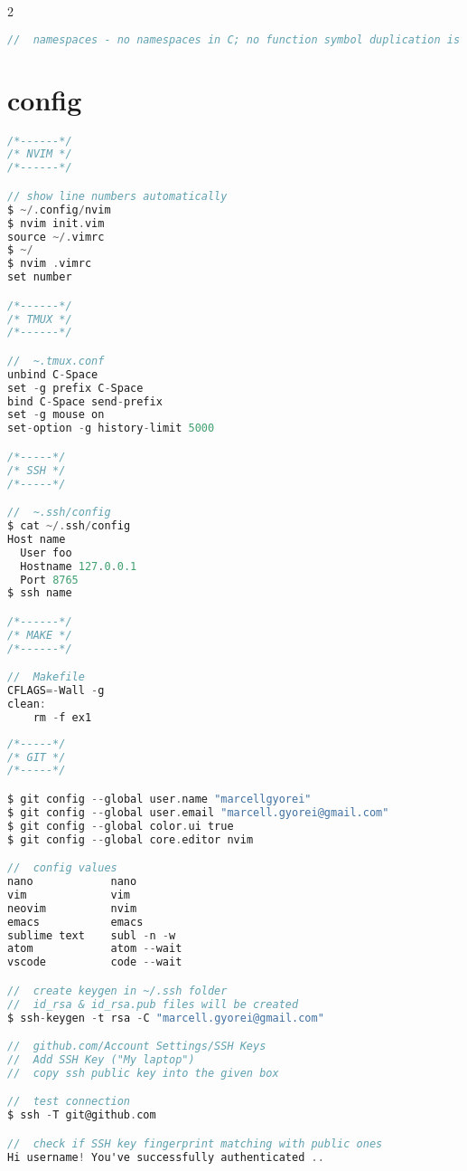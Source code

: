 \documentclass[8pt]{extarticle}
\begin{document}
\begin{small}
\begin{multicols}{2}
\begin{lstlisting}[language=C]
//  namespaces - no namespaces in C; no function symbol duplication is allowed; prefixes are used; HAL_StatusTypeDef; it means StatusTypeDef belongs to HAL library

\end{lstlisting}

\vfill\null

\section{config}

\begin{lstlisting}[language=C]
/*------*/
/* NVIM */
/*------*/

// show line numbers automatically
$ ~/.config/nvim
$ nvim init.vim
source ~/.vimrc
$ ~/
$ nvim .vimrc
set number

/*------*/
/* TMUX */
/*------*/

//  ~.tmux.conf
unbind C-Space
set -g prefix C-Space
bind C-Space send-prefix
set -g mouse on
set-option -g history-limit 5000

/*-----*/
/* SSH */
/*-----*/

//  ~.ssh/config
$ cat ~/.ssh/config
Host name
  User foo
  Hostname 127.0.0.1
  Port 8765
$ ssh name

/*------*/
/* MAKE */
/*------*/

//  Makefile
CFLAGS=-Wall -g
clean:
	rm -f ex1

\end{lstlisting}

\begin{lstlisting}[language=C]
/*-----*/
/* GIT */
/*-----*/

$ git config --global user.name "marcellgyorei"
$ git config --global user.email "marcell.gyorei@gmail.com"
$ git config --global color.ui true
$ git config --global core.editor nvim

//  config values
nano			nano
vim				vim
neovim			nvim
emacs			emacs
sublime text	subl -n -w
atom			atom --wait
vscode			code --wait

//  create keygen in ~/.ssh folder
//  id_rsa & id_rsa.pub files will be created
$ ssh-keygen -t rsa -C "marcell.gyorei@gmail.com"

//  github.com/Account Settings/SSH Keys
//  Add SSH Key ("My laptop")
//  copy ssh public key into the given box

//  test connection
$ ssh -T git@github.com

//  check if SSH key fingerprint matching with public ones
Hi username! You've successfully authenticated ..
\end{lstlisting}


\end{multicols}
\end{small}
\end{document}
